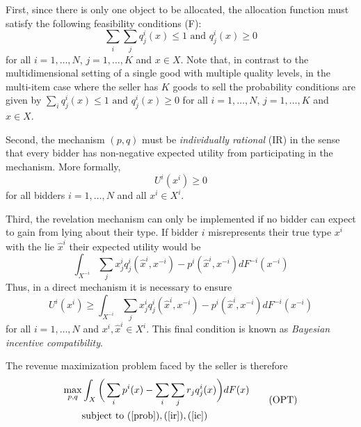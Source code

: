 First, since there is only one object to be allocated, the allocation function must satisfy the following feasibility conditions (F):
\begin{equation}\label{prob}
    \sum_i \sum_j q_j^i(x) \leq 1 \text{ and } q_j^i(x) \geq 0 \tag{F}
\end{equation}
\noindent for all $i=1,\dots,N$, $j=1,\dots,K$ and $x \in X$. Note that, in contrast to the multidimensional setting of a single good with multiple quality levels, in the multi-item case where the seller has $K$ goods to sell the probability conditions are given by $\sum_i q_j^i(x) \leq 1 \text{ and } q_j^i(x) \geq 0$ for all $i=1,\dots,N$, $j=1,\dots,K$ and $x \in X$.

Second, the mechanism $(p,q)$ must be \textit{individually rational} (IR) in the sense that every bidder has non-negative expected utility from participating in the mechanism. More formally,
\begin{equation}\label{ir}
    U^i(x^i) \geq 0 \tag{IR}
\end{equation}
\noindent for all bidders $i=1,\dots,N$ and all $x^i \in X^i$.

Third, the revelation mechanism can only be implemented if no bidder can expect to gain from lying about their type. If bidder $i$ misrepresents their true type $x^i$ with the lie $\widehat{x}^i$ their expected utility would be
\begin{equation}
    \int_{X^{-i}} \sum_j x_j^i q_j^i(\widehat{x}^i,x^{-i}) - p^i(\widehat{x}^i,x^{-i}) dF^{-i}(x^{-i})
\end{equation}
\noindent Thus, in a direct mechanism it is necessary to ensure
\begin{equation}\label{ic}
    U^i(x^i) \geq \int_{X^{-i}} \sum_j x_j^i q_j^i(\widehat{x}^i,x^{-i}) - p^i(\widehat{x}^i,x^{-i}) dF^{-i}(x^{-i}) \tag{IC}
\end{equation}
\noindent for all $i=1,\dots,N$ and $x^i, \widehat{x}^i \in X^i$. This final condition is known as \textit{Bayesian incentive compatibility}.

The revenue maximization problem faced by the seller is therefore
\begin{equation}
\begin{aligned}\label{eq_opt}
    \max_{p,q} &\int_X \bigg( \sum_i p^i(x)  - \sum_i \sum_j r_j q_j^i(x) \bigg) dF(x) \\
    &\text{subject to } (\ref{prob}), (\ref{ir}), (\ref{ic})
\end{aligned}  \tag{OPT} 
\end{equation}

